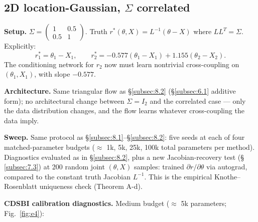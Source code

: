 \documentclass[11pt]{article}
\begin{document}
\subsection{2D location-Gaussian, \(\Sigma\) correlated}\label{subsec:8.3}

\textbf{Setup.}
\(\Sigma = \begin{pmatrix} 1 & 0.5 \\ 0.5 & 1 \end{pmatrix}\). Truth
\(r^*(\theta, X) = L^{-1}(\theta - X)\) where \(LL^T = \Sigma\).
Explicitly:
\[r_1^* = \theta_1 - X_1, \qquad r_2^* = -0.577(\theta_1 - X_1) + 1.155(\theta_2 - X_2).\]
The conditioning network for \(r_2\) now must learn nontrivial
cross-coupling on \((\theta_1, X_1)\), with slope \(-0.577\).

\textbf{Architecture.} Same triangular flow as \S\ref{subsec:8.2}
(\S\ref{subsec:6.1} additive form); no architectural change between
\(\Sigma = I_2\) and the correlated case --- only the data
distribution changes, and the flow learns whatever cross-coupling
the data imply.

\textbf{Sweep.} Same protocol as \S\ref{subsec:8.1}--\S\ref{subsec:8.2}:
five seeds at each of four matched-parameter budgets (\(\approx\) 1k,
5k, 25k, 100k total parameters per method). Diagnostics evaluated as
in \S\ref{subsec:8.2}, plus a new Jacobian-recovery test (\S
\ref{subsec:7.3}) at 200 random joint \((\theta, X)\) samples: trained
\(\partial r / \partial \theta\) via autograd, compared to the
constant truth Jacobian \(L^{-1}\). This is the empirical
Knothe--Rosenblatt uniqueness check (Theorem A-d).

\textbf{CDSBI calibration diagnostics.} Medium budget
(\(\approx\) 5k parameters; Fig.~\ref{fig:e4}):
\end{document}
